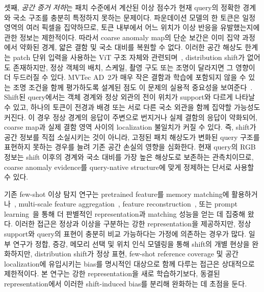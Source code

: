 셋째, \emph{공간 증거 저하}는 패치 수준에서 계산된 이상 점수가 현재 query의
정확한 경계와 국소 구조를 충분히 특정하지 못하는 문제이다. 파운데이션 모델의
한 토큰은 일정 영역의 여러 픽셀을 집약하므로, 토큰 내부에서 어느 위치가
이상 반응을 유발했는지에 관한 정보는 제한적이다. 따라서 coarse anomaly
map의 단순 보간은 이미 집약 과정에서 약화된 경계, 얇은 결함 및 국소 대비를
복원할 수 없다. 이러한 공간 해상도 한계는 patch 단위 입력을 사용하는 ViT
구조 자체와 관련되며~\cite{dosovitskiy2021vit}, distribution shift가 없어도
존재하지만, 정상 객체의 배치, 스케일, 촬영 구도 또는 조명이 달라지면 그
영향이 더 두드러질 수 있다. MVTec AD~2가 매우 작은 결함과 학습에 포함되지
않을 수 있는 조명 조건을 함께 평가하도록 설계된 점도 이 문제의 실용적
중요성을 보여준다~\cite{hecklerkram2026mvtecad2}. Shift된 query에서는 객체 경계와 정상 외관의
전이 위치가 support와 다르게 나타날 수 있고, 하나의 토큰이 전경과 배경 또는
서로 다른 국소 외관을 함께 집약할 가능성도 커진다. 이 경우 정상 경계의
응답이 주변으로 번지거나 실제 결함의 응답이 약화되어, coarse map과 실제
결함 영역 사이의 localization 불일치가 커질 수 있다. 즉, shift가 공간 정보를
직접 소실시키는 것이 아니라, 고정된 패치 해상도가 변화된 query 구조를
표현하지 못하는 경우를 늘려 기존 공간 손실의 영향을 심화한다. 현재 query의
RGB 정보는 shift 이후의 경계와 국소 대비를 가장 높은 해상도로 보존하는
관측치이므로, coarse anomaly evidence를 query-native structure에 맞게 정제하는 단서로
사용할 수 있다.

기존 few-shot 이상 탐지 연구는 pretrained feature를 memory matching에
활용하거나~\cite{roth2022patchcore,damm2025anomalydino}, multi-scale feature
aggregation~\cite{jeong2023winclip}, feature reconstruction~\cite{fang2023fastrecon},
또는 prompt learning~\cite{li2024promptad}을 통해 더 판별적인 representation과
matching 성능을 얻는 데 집중해 왔다. 이러한 접근은 정상과 이상을 구분하는 강한 representation을
제공하지만, 정상 support와 query의 표현이 충분히 비교 가능하다는 가정에
의존하는 경우가 많다. 일부 연구가 정합, 증강, 메모리 선택 및 위치 인식
모델링을 통해 shift의 개별 현상을 완화하지만, distribution shift가 정상
표현, few-shot reference coverage 및 공간 localization에 유입시키는 bias를
명시적인 대상으로 함께 다루는 접근은 상대적으로 제한적이다. 본 연구는 강한
representation을 새로 학습하기보다, 동결된 representation에서 이러한
shift-induced bias를 분리해 완화하는 데 초점을 둔다.

